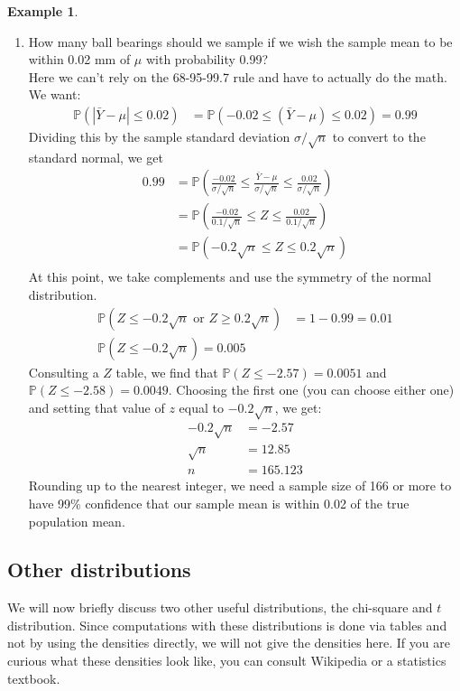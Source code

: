 \documentclass[12pt]{article}
\theoremstyle{definition}
\newtheorem*{example}{Example}
\theoremstyle{remark}
\def\P{{\mathbb P}}
\begin{document}
\begin{example}
\begin{enumerate}
\item How many ball bearings should we sample if we wish the sample mean to be within 0.02 mm of $\mu$ with probability 0.99?\\

Here we can't rely on the 68-95-99.7 rule and have to actually do the math. We want:
\begin{align*}
\P( |\bar{Y} - \mu| \leq 0.02) &= \P( -0.02 \leq (\bar{Y} - \mu) \leq 0.02 ) = 0.99
\end{align*}
Dividing this by the sample standard deviation $\sigma / \sqrt{n}$ to convert to the standard normal, we get
\begin{align*}
0.99 &= \P\left( \frac{-0.02}{\sigma/\sqrt{n}} \leq \frac{\bar{Y} - \mu}{\sigma/\sqrt{n}} \leq \frac{0.02}{\sigma/\sqrt{n}}  \right) \\
&= \P\left( \frac{-0.02}{0.1/\sqrt{n}} \leq Z \leq \frac{0.02}{0.1/\sqrt{n}} \right)\\
&= \P(-0.2 \sqrt{n} \leq Z \leq 0.2 \sqrt{n}) \\
\end{align*}
At this point, we take complements and use the symmetry of the normal distribution.
\begin{align*}
\P(Z \leq -0.2 \sqrt{n} \text{ or } Z \geq 0.2 \sqrt{n}) &= 1 - 0.99 = 0.01 \\
\P(Z \leq -0.2 \sqrt{n}) = 0.005
\end{align*}
Consulting a $Z$ table, we find that $\P(Z \leq -2.57) = 0.0051$ and $\P(Z \leq -2.58) = 0.0049$. Choosing the first one (you can choose either one) and setting that value of $z$ equal to $-0.2 \sqrt{n}$, we get:
\begin{align*}
-0.2 \sqrt{n} &= -2.57 \\
\sqrt{n} &= 12.85 \\
n &= 165.123
\end{align*}
Rounding up to the nearest integer, we need a sample size of 166 or more to have 99\% confidence that our sample mean is within 0.02 of the true population mean.
\end{enumerate}

\end{example}

\subsection{Other distributions}
We will now briefly discuss two other useful distributions, the chi-square and $t$ distribution. Since computations with these distributions is done via tables and not by using the densities directly, we will not give the densities here. If you are curious what these densities look like, you can consult Wikipedia or a statistics textbook.\\
\end{document}
